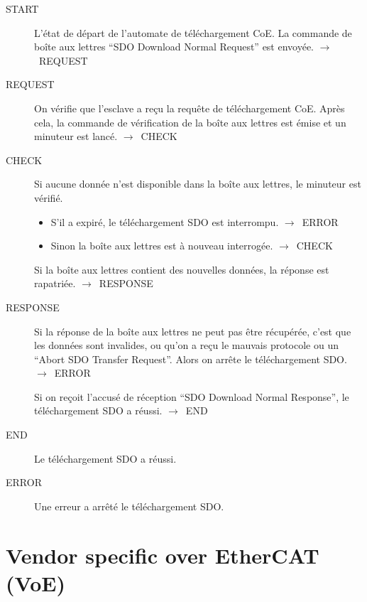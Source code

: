 \documentclass[a4paper,12pt,BCOR6mm,bibtotoc,idxtotoc]{scrbook}
\begin{document}
\begin{description}
\item[START] L'\'etat de d\'epart de l'automate de t\'el\'echargement
  CoE. La commande de bo\^ite aux lettres ``SDO Download
  Normal Request'' est envoy\'ee. $\rightarrow$~REQUEST

\item[REQUEST] On v\'erifie que l'esclave a re\c{c}u la requ\^ete de t\'el\'echargement CoE. Apr\`es cela, la commande de v\'erification de la bo\^ite aux lettres est \'emise et un minuteur est lanc\'e. $\rightarrow$~CHECK

\item[CHECK] Si aucune donn\'ee n'est disponible
  dans la bo\^ite aux lettres, le minuteur est v\'erifi\'e.
  \begin{itemize}
  \item S'il a expir\'e, le t\'el\'echargement SDO est interrompu.
    $\rightarrow$~ERROR
  \item Sinon la bo\^ite aux lettres est \`a nouveau interrog\'ee.
    $\rightarrow$~CHECK
  \end{itemize}

  Si la bo\^ite aux lettres contient des nouvelles donn\'ees, la
  r\'eponse est rapatri\'ee.  $\rightarrow$~RESPONSE

\item[RESPONSE] Si la r\'eponse de la bo\^ite aux lettres ne peut pas
  \^etre r\'ecup\'er\'ee, c'est que les donn\'ees sont invalides, ou
  qu'on a re\c{c}u le mauvais protocole ou un ``Abort SDO Transfer
  Request''.  Alors on arr\^ete le t\'el\'echargement SDO.
  $\rightarrow$~ERROR

  Si on re\c{c}oit l'accus\'e de r\'eception ``SDO Download Normal
  Response'', le t\'el\'echargement SDO a r\'eussi. $\rightarrow$~END

\item[END] Le t\'el\'echargement SDO a r\'eussi.

\item[ERROR] Une erreur a arr\^et\'e le t\'el\'echargement SDO.

\end{description}


\section{Vendor specific over EtherCAT (VoE)}
\label{sec:voe}
\end{document}
